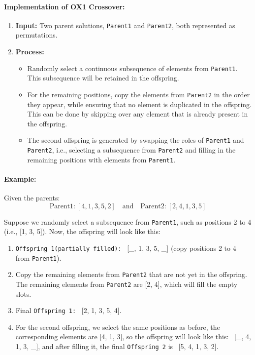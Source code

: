 \documentclass[11pt]{article}
\begin{document}
\paragraph{Implementation of OX1 Crossover:}

\begin{enumerate}
    \item \textbf{Input:} Two parent solutions, \texttt{Parent1} and \texttt{Parent2}, both represented as permutations.
    \item \textbf{Process:}
    \begin{itemize}
        \item Randomly select a continuous subsequence of elements from \texttt{Parent1}. This subsequence will be retained in the offspring.
        \item For the remaining positions, copy the elements from \texttt{Parent2} in the order they appear, while ensuring that no element is duplicated in the offspring. This can be done by skipping over any element that is already present in the offspring.
        \item The second offspring is generated by swapping the roles of \texttt{Parent1} and \texttt{Parent2}, i.e., selecting a subsequence from \texttt{Parent2} and filling in the remaining positions with elements from \texttt{Parent1}.
    \end{itemize}
\end{enumerate}

\paragraph{Example:}

Given the parents:
\[
\text{Parent1:} \ [4, 1, 3, 5, 2]
\quad \text{and} \quad \text{Parent2:} \ [2, 4, 1, 3, 5]
\]

Suppose we randomly select a subsequence from \texttt{Parent1}, such as positions 2 to 4 (i.e., [1, 3, 5]). Now, the offspring will look like this:

\begin{enumerate}
    \item \texttt{Offspring 1(partially filled):} \ [\_, 1, 3, 5, \_] (copy positions 2 to 4 from \texttt{Parent1}).
    \item Copy the remaining elements from \texttt{Parent2} that are not yet in the offspring. The remaining elements from \texttt{Parent2} are [2, 4], which will fill the empty slots.
    \item Final \texttt{Offspring 1:} \ [2, 1, 3, 5, 4].
    \item For the second offspring, we select the same positions as before, the corresponding elements are [4, 1, 3], so the offspring will look like this: \ [\_, 4, 1, 3, \_], and after filling it, the final \texttt{Offspring 2} is \ [5, 4, 1, 3, 2].
\end{enumerate}
\end{document}
